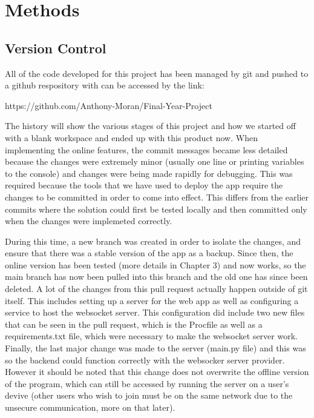 \chapter{Methods}
\label{chapter2}

\section{Version Control}
All of the code developed for this project has been managed by git and pushed to a github respository with can be accessed by the link:

\begin{center}
    https://github.com/Anthony-Moran/Final-Year-Project
\end{center}

The history will show the various stages of this project and how we started off with a blank workspace and ended up with this product now.
\linebreak
When implementing the online features, the commit messages became less detailed because the changes were extremely minor (usually one line or printing variables to the console) and changes were being made rapidly for debugging. This was required because the tools that we have used to deploy the app require the changes to be committed in order to come into effect. This differs from the earlier commits where the solution could first be tested locally and then committed only when the changes were implemeted correctly.

During this time, a new branch was created in order to isolate the changes, and ensure that there was a stable version of the app as a backup. Since then, the online version has been tested (more details in Chapter 3) and now works, so the main branch has now been pulled into this branch and the old one has since been deleted. A lot of the changes from this pull request actually happen outside of git itself. This includes setting up a server for the web app as well as configuring a service to host the websocket server. This configuration did include two new files that can be seen in the pull request, which is the Procfile as well as a requirements.txt file, which were necessary to make the websocket server work. Finally, the last major change was made to the server (main.py file) and this was so the backend could function correctly with the websocker server provider. However it should be noted that this change does not overwrite the offline version of the program, which can still be accessed by running the server on a user's devive (other users who wish to join must be on the same network due to the unsecure communication, more on that later).

